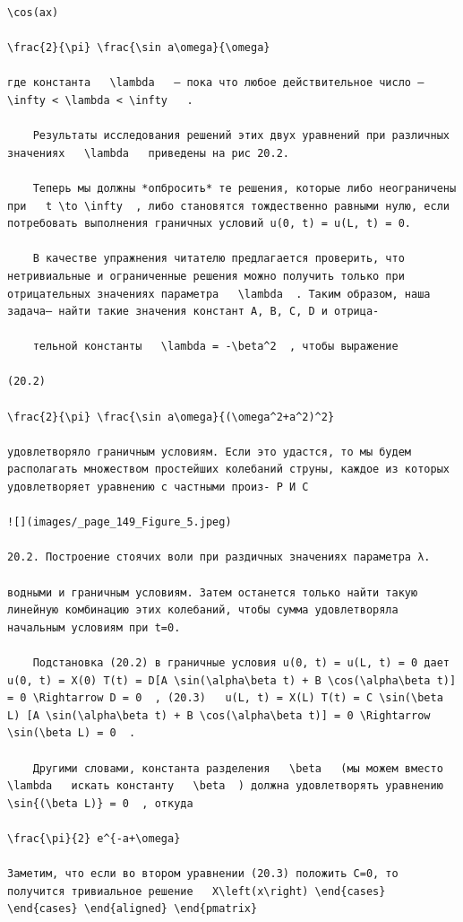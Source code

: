 \documentclass[
  ukrainian,
]{article}
\begin{document}
\begin{verbatim}
\cos(ax)

\frac{2}{\pi} \frac{\sin a\omega}{\omega}

где константа   \lambda   — пока что любое действительное число —   \infty < \lambda < \infty   .

    Результаты исследования решений этих двух уравнений при различных значениях   \lambda   приведены на рис 20.2.

    Теперь мы должны *опбросить* те решения, которые либо неограничены при   t \to \infty  , либо становятся тождественно равными нулю, если потребовать выполнения граничных условий u(0, t) = u(L, t) = 0.

    В качестве упражнения читателю предлагается проверить, что нетривиальные и ограниченные решения можно получить только при отрицательных значениях параметра   \lambda  . Таким образом, наша задача— найти такие значения констант A, B, C, D и отрица-

    тельной константы   \lambda = -\beta^2  , чтобы выражение

(20.2)

\frac{2}{\pi} \frac{\sin a\omega}{(\omega^2+a^2)^2}

удовлетворяло граничным условиям. Если это удастся, то мы будем располагать множеством простейших колебаний струны, каждое из которых удовлетворяет уравнению с частными произ- Р И С

![](images/_page_149_Figure_5.jpeg)

20.2. Построение стоячих воли при раздичных значениях параметра λ.

водными и граничным условиям. Затем останется только найти такую линейную комбинацию этих колебаний, чтобы сумма удовлетворяла начальным условиям при t=0.

    Подстановка (20.2) в граничные условия u(0, t) = u(L, t) = 0 дает   u(0, t) = X(0) T(t) = D[A \sin(\alpha\beta t) + B \cos(\alpha\beta t)] = 0 \Rightarrow D = 0  , (20.3)   u(L, t) = X(L) T(t) = C \sin(\beta L) [A \sin(\alpha\beta t) + B \cos(\alpha\beta t)] = 0 \Rightarrow \sin(\beta L) = 0  .

    Другими словами, константа разделения   \beta   (мы можем вместо   \lambda   искать константу   \beta  ) должна удовлетворять уравнению   \sin{(\beta L)} = 0  , откуда

\frac{\pi}{2} e^{-a+\omega}

Заметим, что если во втором уравнении (20.3) положить C=0, то получится тривиальное решение   X\left(x\right) \end{cases} \end{cases} \end{aligned} \end{pmatrix}
\end{verbatim}
\end{document}
